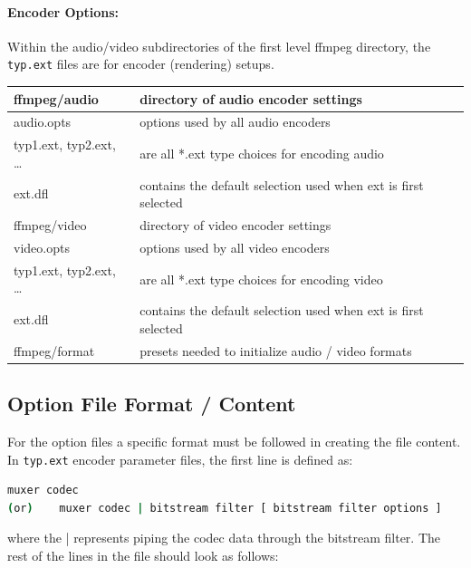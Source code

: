 \paragraph{Encoder Options:} Within the audio/video subdirectories of the first level ffmpeg directory, the \texttt{typ.ext} files are for encoder (rendering) setups.

\begin{center}
    \begin{longtable}{l p{23em}}
        \toprule
        ffmpeg/audio & directory of audio encoder settings \\
        \midrule
        audio.opts & options used by all audio encoders \\
        typ1.ext, typ2.ext, … & are all *.ext type choices for encoding audio \\
        ext.dfl & contains the default selection used when ext is first selected \\
        \midrule
        ffmpeg/video & directory of video encoder settings \\
        \midrule
        video.opts & options used by all video encoders \\
        typ1.ext, typ2.ext, … & are all *.ext type choices for encoding video \\
        ext.dfl & contains the default selection used when ext is first selected \\
        \midrule
        ffmpeg/format & presets needed to initialize audio / video formats \\
        \bottomrule
    \end{longtable}
\end{center}

\subsection{Option File Format / Content}%
\label{sub:option_file_format_content}

For the option files a specific format must be followed in creating the file content.
In \texttt{typ.ext} encoder parameter files, the first line is defined as:

\begin{lstlisting}[language=bash,numbers=none]
      muxer codec
(or) 	muxer codec | bitstream filter [ bitstream filter options ]
\end{lstlisting}

where the | represents piping the codec data through the bitstream filter. The rest of the lines in the file should look as follows:

